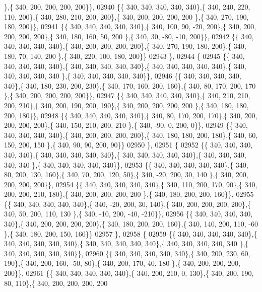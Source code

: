 \begin{DoxyCode}
      \},\{ 340, 200, 200, 200, 200\}\},
02940 \{\{ 340, 340, 340, 340, 340\},\{ 340, 240, 220, 110, 200\},\{ 340, 280, 210, 200, 200\},\{ 340, 200, 200, 200, 200
      \},\{ 340, 270, 190, 180, 200\}\},
02941 \{\{ 340, 340, 340, 340, 340\},\{ 340, 100,  90, -20, 200\},\{ 340, 200, 200, 200, 200\},\{ 340, 180, 160,  50, 200
      \},\{ 340,  30, -80, -10, 200\}\},
02942 \{\{ 340, 340, 340, 340, 340\},\{ 340, 200, 200, 200, 200\},\{ 340, 270, 190, 180, 200\},\{ 340, 180,  70, 140, 200
      \},\{ 340, 220, 100, 180, 200\}\}
02943 \},
02944 \{
02945 \{\{ 340, 340, 340, 340, 340\},\{ 340, 340, 340, 340, 340\},\{ 340, 340, 340, 340, 340\},\{ 340, 340, 340, 340, 340
      \},\{ 340, 340, 340, 340, 340\}\},
02946 \{\{ 340, 340, 340, 340, 340\},\{ 340, 180, 230, 200, 230\},\{ 340, 170, 160, 200, 160\},\{ 340,  80, 170, 200, 170
      \},\{ 340, 200, 200, 200, 200\}\},
02947 \{\{ 340, 340, 340, 340, 340\},\{ 340, 210, 210, 200, 210\},\{ 340, 200, 190, 200, 190\},\{ 340, 200, 200, 200, 200
      \},\{ 340, 180, 180, 200, 180\}\},
02948 \{\{ 340, 340, 340, 340, 340\},\{ 340,  80, 170, 200, 170\},\{ 340, 200, 200, 200, 200\},\{ 340, 150, 210, 200, 210
      \},\{ 340, -90,   0, 200,   0\}\},
02949 \{\{ 340, 340, 340, 340, 340\},\{ 340, 200, 200, 200, 200\},\{ 340, 180, 180, 200, 180\},\{ 340,  60, 150, 200, 150
      \},\{ 340,  90,  90, 200,  90\}\}
02950 \},
02951 \{
02952 \{\{ 340, 340, 340, 340, 340\},\{ 340, 340, 340, 340, 340\},\{ 340, 340, 340, 340, 340\},\{ 340, 340, 340, 340, 340
      \},\{ 340, 340, 340, 340, 340\}\},
02953 \{\{ 340, 340, 340, 340, 340\},\{ 340,  80, 200, 130, 160\},\{ 340,  70, 200, 120,  50\},\{ 340, -20, 200,  30, 140
      \},\{ 340, 200, 200, 200, 200\}\},
02954 \{\{ 340, 340, 340, 340, 340\},\{ 340, 110, 200, 170,  90\},\{ 340, 200, 200, 210, 180\},\{ 340, 200, 200, 200, 200
      \},\{ 340, 180, 200, 200, 160\}\},
02955 \{\{ 340, 340, 340, 340, 340\},\{ 340, -20, 200,  30, 140\},\{ 340, 200, 200, 200, 200\},\{ 340,  50, 200, 110, 130
      \},\{ 340, -10, 200, -40, -210\}\},
02956 \{\{ 340, 340, 340, 340, 340\},\{ 340, 200, 200, 200, 200\},\{ 340, 180, 200, 200, 160\},\{ 340, 140, 200, 110, -60
      \},\{ 340, 180, 200, 150, 160\}\}
02957 \},
02958 \{
02959 \{\{ 340, 340, 340, 340, 340\},\{ 340, 340, 340, 340, 340\},\{ 340, 340, 340, 340, 340\},\{ 340, 340, 340, 340, 340
      \},\{ 340, 340, 340, 340, 340\}\},
02960 \{\{ 340, 340, 340, 340, 340\},\{ 340, 200, 230,  60, 190\},\{ 340, 200, 160, -50,  80\},\{ 340, 200, 170,  40, 180
      \},\{ 340, 200, 200, 200, 200\}\},
02961 \{\{ 340, 340, 340, 340, 340\},\{ 340, 200, 210,   0, 130\},\{ 340, 200, 190,  80, 110\},\{ 340, 200, 200, 200, 200

\end{DoxyCode}
